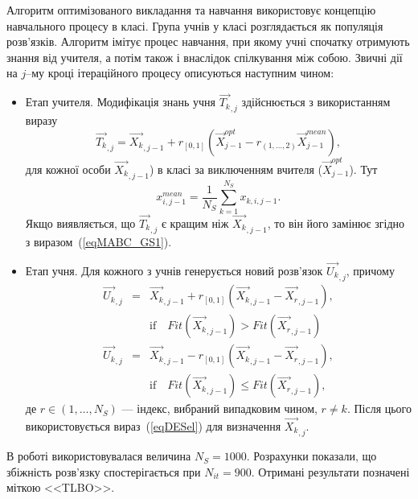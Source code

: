 Алгоритм оптимізованого викладання та навчання використовує концепцію навчального процесу в класі.
Група учнів у класі розглядається як популяція розв'язків.
Алгоритм імітує процес навчання, при якому учні спочатку отримують знання від учителя, а потім також і внаслідок спілкування між собою.
Звичні дії на $j$--му кроці ітераційного процесу описуються наступним чином\cite{TLBO_Patel}:
\begin{itemize}
  \item Етап учителя.
 Модифікація знань учня $\overrightarrow{T_{k}}_{,j}$ здійснюється з використанням виразу
   \begin{equation}
  \label{eqTLBOTP}
   \overrightarrow{T_{k}}_{,j}=\overrightarrow{X_{k}}_{,j-1}+r_{[0,1]}\left(\overrightarrow{X}_{j-1}^{opt}-
      r_{(1,\ldots,2)}\overrightarrow{X}_{j-1}^{mean}\right),
  \end{equation}
  для кожної особи $\overrightarrow{X_{k}}_{,j-1}$) в класі за виключенням вчителя ($\overrightarrow{X}_{j-1}^{opt}$).
  Тут
    \begin{equation}
 \label{eqTLBOMean}
  x_{i,j-1}^{mean}=\frac{1}{N_S}\sum_{k=1}^{N_S}x_{k,i,j-1}.
  \end{equation}
  Якщо виявляється, що $\overrightarrow{T_{k}}_{,j}$ є кращим ніж $\overrightarrow{X_{k}}_{,j-1}$, то він його замінює згідно з виразом~(\ref{eqMABC_GS1}).



  \item Етап учня.
  Для кожного з учнів генерується новий розв'язок $\overrightarrow{U_{k}}_{,j}$, причому
\begin{eqnarray}
 \label{eqTLBOLP}
 \overrightarrow{U_{k}}_{,j}&=&\overrightarrow{X_{k}}_{,j-1}+r_{[0,1]}\left(\overrightarrow{X_{k}}_{,j-1}-\overrightarrow{X_{r}}_{,j-1}\right),
\\
&& \text{if}\quad Fit(\overrightarrow{X_{k}}_{,j-1})>Fit(\overrightarrow{X_{r}}_{,j-1})
\nonumber
\\
 \label{eqTLBOLP2}
 \overrightarrow{U_{k}}_{,j}&=&\overrightarrow{X_{k}}_{,j-1}-r_{[0,1]}\left(\overrightarrow{X_{k}}_{,j-1}-\overrightarrow{X_{r}}_{,j-1}\right),
\\
&& \text{if}\quad Fit(\overrightarrow{X_{k}}_{,j-1})\leq Fit(\overrightarrow{X_{r}}_{,j-1}),
\nonumber
\end{eqnarray}
де
$r\in(1,\ldots,N_S)$ --- індекс, вибраний випадковим чином, $r\neq k$.
Після цього використовується вираз~(\ref{eqDESel}) для визначення $\overrightarrow{X_{k}}_{,j}$.
\end{itemize}
В роботі використовувалася величина $N_S=1000$.
Розрахунки показали, що збіжність розв'язку спостерігається при $N_{it}=900$.
Отримані результати позначені міткою <<TLBO>>.

